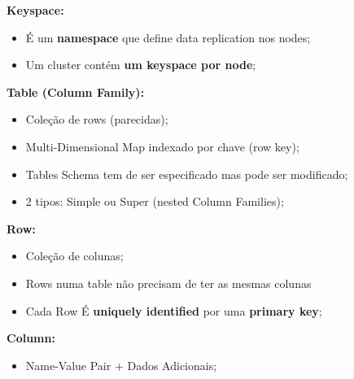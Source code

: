 \documentclass{article}
\begin{document}
\begin{flushleft}
  \textbf{Keyspace:}
  \begin{itemize}
    \item É um \textbf{namespace} que define data replication nos nodes;
    \item Um cluster contém \textbf{um keyspace por node};
  \end{itemize}

  \vspace{2mm}

  \textbf{Table (Column Family):}
  \begin{itemize}
    \item Coleção de rows (parecidas);
    \item Multi-Dimensional Map indexado por chave (row key);
    \item Tables Schema tem de ser especificado mas pode ser modificado;
    \item 2 tipos: Simple ou Super (nested Column Families);
  \end{itemize}

  \vspace{2mm}
  
  \textbf{Row:}
  \begin{itemize}
    \item Coleção de colunas;
    \item Rows numa table não precisam de ter as mesmas colunas
    \item Cada Row É \textbf{uniquely identified} por uma \textbf{primary key};
  \end{itemize}

  \vspace{2mm}

  \textbf{Column:}
  \begin{itemize}
    \item Name-Value Pair + Dados Adicionais;
  \end{itemize}
\end{flushleft}
\end{document}
